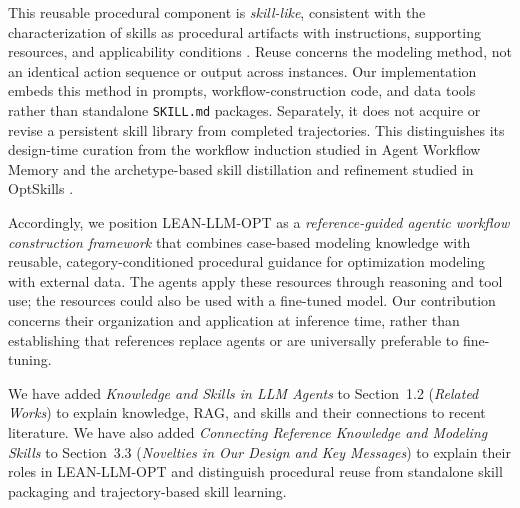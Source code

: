{This reusable procedural component is \emph{skill-like}, consistent with the characterization of skills as procedural artifacts with instructions, supporting resources, and applicability conditions \citep{ae1_zhou2026skillsurvey}. Reuse concerns the modeling method, not an identical action sequence or output across instances. Our implementation embeds this method in prompts, workflow-construction code, and data tools rather than standalone \texttt{SKILL.md} packages. Separately, it does not acquire or revise a persistent skill library from completed trajectories. This distinguishes its design-time curation from the workflow induction studied in Agent Workflow Memory and the archetype-based skill distillation and refinement studied in OptSkills \citep{ae1_wang2025awm,ae1_yang2026optskills}.

Accordingly, we position LEAN-LLM-OPT as a \emph{reference-guided agentic workflow construction framework} that combines case-based modeling knowledge with reusable, category-conditioned procedural guidance for optimization modeling with external data. The agents apply these resources through reasoning and tool use; the resources could also be used with a fine-tuned model. Our contribution concerns their organization and application at inference time, rather than establishing that references replace agents or are universally preferable to fine-tuning.

We have added \emph{Knowledge and Skills in LLM Agents} to Section~1.2 (\emph{Related Works}) to explain knowledge, RAG, and skills and their connections to recent literature. We have also added \emph{Connecting Reference Knowledge and Modeling Skills} to Section~3.3 (\emph{Novelties in Our Design and Key Messages}) to explain their roles in LEAN-LLM-OPT and distinguish procedural reuse from standalone skill packaging and trajectory-based skill learning.
}
